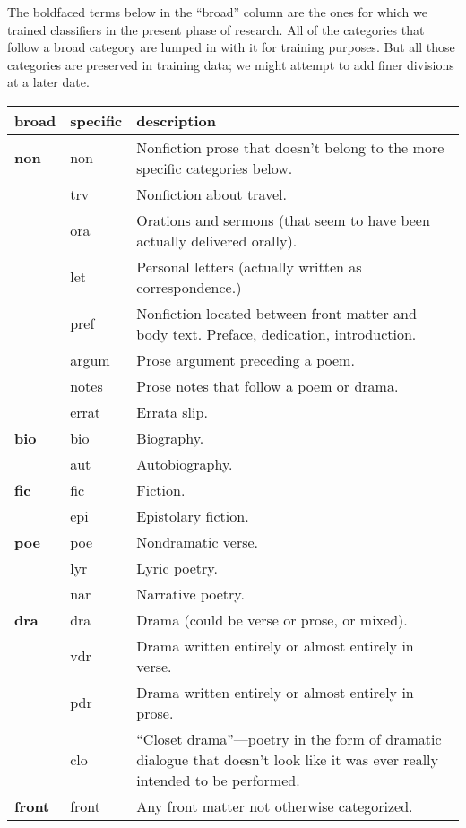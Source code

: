 \documentclass[paper=a4, fontsize=12pt]{scrartcl}
\numberwithin{equation}{section}		%
\numberwithin{figure}{section}			%
\numberwithin{table}{section}				%
\begin{document}
The boldfaced terms below in the ``broad'' column are the ones for which we trained classifiers in the present phase of research. All of the categories that follow a broad category are lumped in with it for training purposes. But all those categories are preserved in training data; we might attempt to add finer divisions at a later date.

\begin{center}
\begin{longtable}{ | l | l | p{10cm} |}
\hline
broad & specific & description \\ \hline \hline
\textbf{non} & non & Nonfiction prose that doesn't belong to the more specific categories below. \\ \hline
 & trv & Nonfiction about travel. \\ \hline
 & ora	& Orations and sermons (that seem to have been actually delivered orally). \\ \hline
 & let & Personal letters (actually written as correspondence.) \\ \hline
& pref & Nonfiction located between front matter and body text. Preface, dedication, introduction. \\ \hline
& argum & Prose argument preceding a poem. \\ \hline
& notes & Prose notes that follow a poem or drama. \\ \hline
& errat & Errata slip.  \\ \hline
\textbf{bio} & bio & Biography. \\ \hline
 & aut & Autobiography. \\ \hline
\textbf{fic} & fic & Fiction. \\ \hline
 & epi & Epistolary fiction. \\ \hline
 \textbf{poe} & poe & Nondramatic verse. \\ \hline
& lyr & Lyric poetry. \\ \hline
& nar & Narrative poetry. \\ \hline
\textbf{dra} & dra & Drama (could be verse or prose, or mixed).  \\ \hline
& vdr & Drama written entirely or almost entirely in verse.  \\ \hline
& pdr & Drama written entirely or almost entirely in prose.  \\ \hline
& clo & ``Closet drama''---poetry in the form of dramatic dialogue that doesn't look like it was ever really intended to be performed.  \\ \hline
\textbf{front} & front & Any front matter not otherwise categorized.  \\ \hline

\end{longtable}
\end{center}
\end{document}
